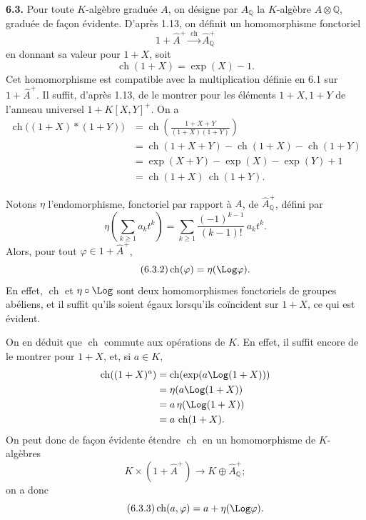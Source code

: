 \documentclass[11pt]{article}
\newcommand{\ch}{\operatorname{ch}}
\providecommand{\ch}{\operatorname{ch}}
\begin{document}
\textbf{6.3.} Pour toute \(K\)-algèbre graduée \(A\), on désigne par \(A_{\mathbb Q}\) la \(K\)-algèbre \(A\otimes\mathbb Q\), graduée de façon évidente. D'après 1.13, on définit un homomorphisme fonctoriel
\[
  1+\widehat A^+\xrightarrow{\ \ch\ }\widehat A_{\mathbb Q}^{+}
\]
en donnant sa valeur pour \(1+X\), soit
\begin{equation}\tag{6.3.1}
  \ch(1+X)=\exp(X)-1.
\end{equation}
Cet homomorphisme est compatible avec la multiplication définie en 6.1 sur \(1+\widehat A^+\). Il suffit, d'après 1.13, de le montrer pour les éléments \(1+X,1+Y\) de l'anneau universel \(1+K[X,Y]^+\). On a
\[
\begin{aligned}
 \ch\bigl((1+X)*(1+Y)\bigr)
 &= \ch\!\left(\frac{1+X+Y}{(1+X)(1+Y)}\right)\\
 &= \ch(1+X+Y)-\ch(1+X)-\ch(1+Y)\\
 &= \exp(X+Y)-\exp(X)-\exp(Y)+1\\
 &= \ch(1+X)\,\ch(1+Y).
\end{aligned}
\]

Notons \(\eta\) l'endomorphisme, fonctoriel par rapport à \(A\), de \(\widehat A_{\mathbb Q}^{+}\), défini par
\[
 \eta\!\left(\sum_{k\ge1} a_k t^k\right)
 =
 \sum_{k\ge1}\frac{(-1)^{k-1}}{(k-1)!}\,a_k t^k.
\]
Alors, pour tout \(\varphi\in1+\widehat A^+\),
\begin{equation}\tag{6.3.2}
  \ch(\varphi)=\eta(\Log\varphi).
\end{equation}
En effet, \(\ch\) et \(\eta\circ\Log\) sont deux homomorphismes fonctoriels de groupes abéliens, et il suffit qu'ils soient égaux lorsqu'ils coïncident sur \(1+X\), ce qui est évident.

On en déduit que \(\ch\) commute aux opérations de \(K\). En effet, il suffit encore de le montrer pour \(1+X\), et, si \(a\in K\),
\[
\begin{aligned}
 \ch((1+X)^a)
 &=\ch(\exp(a\Log(1+X)))\\
 &=\eta(a\Log(1+X))\\
 &=a\,\eta(\Log(1+X))\\
 &=a\,\ch(1+X).
\end{aligned}
\]
On peut donc de façon évidente étendre \(\ch\) en un homomorphisme de \(K\)-algèbres
\[
  K\times(1+\widehat A^+)\longrightarrow K\oplus\widehat A_{\mathbb Q}^{+};
\]
on a donc
\begin{equation}\tag{6.3.3}
  \ch(a,\varphi)=a+\eta(\Log\varphi).
\end{equation}
\end{document}
